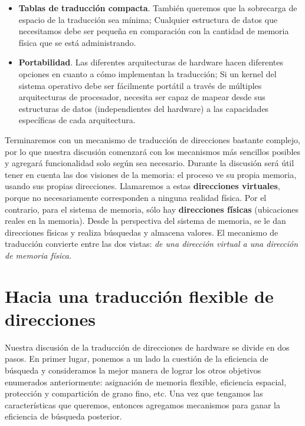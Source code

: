 \documentclass[10pt]{book}
\begin{document}
\begin{itemize}
\item \textbf{Tablas de traducción compacta}. También queremos que la sobrecarga de espacio de la traducción sea mínima; Cualquier estructura de datos que necesitamos debe ser pequeña en comparación con la cantidad de memoria física que se está administrando.

\item \textbf{Portabilidad}. Las diferentes arquitecturas de hardware hacen diferentes opciones en cuanto a cómo implementan la traducción; Si un kernel del sistema operativo debe ser fácilmente portátil a través de múltiples arquitecturas de procesador, necesita ser capaz de mapear desde sus estructuras de datos (independientes del hardware) a las capacidades específicas de cada arquitectura.
\end{itemize}

Terminaremos con un mecanismo de traducción de direcciones bastante complejo, por lo que nuestra discusión comenzará con los mecanismos más sencillos posibles y agregará funcionalidad solo según sea necesario. Durante la discusión será útil tener en cuenta las dos visiones de la memoria: el proceso ve su propia memoria, usando sus propias direcciones. Llamaremos a estas \textbf{direcciones virtuales}, porque no necesariamente corresponden a ninguna realidad física. Por el contrario, para el sistema de memoria, sólo hay \textbf{direcciones físicas} (ubicaciones reales en la memoria). Desde la perspectiva del sistema de memoria, se le dan direcciones físicas y realiza búsquedas y almacena valores. El mecanismo de traducción convierte entre las dos vistas: \textit{de una dirección virtual a una dirección de memoria física}.

\section{Hacia una traducción flexible de direcciones}
Nuestra discusión de la traducción de direcciones de hardware se divide en dos pasos. En primer lugar, ponemos a un lado la cuestión de la eficiencia de búsqueda y consideramos la mejor manera de lograr los otros objetivos enumerados anteriormente: asignación de memoria flexible, eficiencia espacial, protección y compartición de grano fino, etc. Una vez que tengamos las características que queremos, entonces agregamos mecanismos para ganar la eficiencia de búsqueda posterior.
\end{document}
